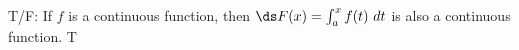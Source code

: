 {T/F: If $f$ is a continuous function, then $\ds F(x) = \int_a^x f(t)\ dt$ is also a continuous function.
}
{T
}

